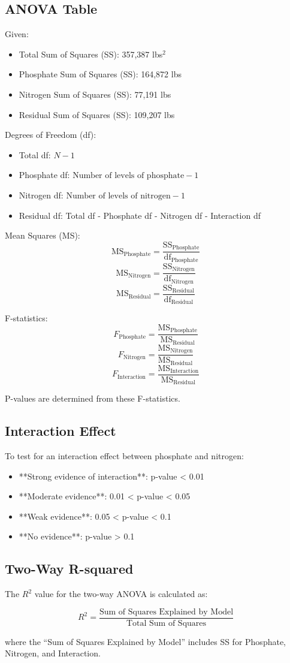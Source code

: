 \documentclass{article}
\begin{document}
\subsection{ANOVA Table}

Given:
\begin{itemize}
    \item Total Sum of Squares (SS): 357,387 lbs\(^2\)
    \item Phosphate Sum of Squares (SS): 164,872 lbs
    \item Nitrogen Sum of Squares (SS): 77,191 lbs
    \item Residual Sum of Squares (SS): 109,207 lbs
\end{itemize}

Degrees of Freedom (df):
\begin{itemize}
    \item Total df: \( N - 1 \)
    \item Phosphate df: \( \text{Number of levels of phosphate} - 1 \)
    \item Nitrogen df: \( \text{Number of levels of nitrogen} - 1 \)
    \item Residual df: Total df - Phosphate df - Nitrogen df - Interaction df
\end{itemize}

Mean Squares (MS):
\[
\text{MS}_{\text{Phosphate}} = \frac{\text{SS}_{\text{Phosphate}}}{\text{df}_{\text{Phosphate}}}
\]
\[
\text{MS}_{\text{Nitrogen}} = \frac{\text{SS}_{\text{Nitrogen}}}{\text{df}_{\text{Nitrogen}}}
\]
\[
\text{MS}_{\text{Residual}} = \frac{\text{SS}_{\text{Residual}}}{\text{df}_{\text{Residual}}}
\]

F-statistics:
\[
F_{\text{Phosphate}} = \frac{\text{MS}_{\text{Phosphate}}}{\text{MS}_{\text{Residual}}}
\]
\[
F_{\text{Nitrogen}} = \frac{\text{MS}_{\text{Nitrogen}}}{\text{MS}_{\text{Residual}}}
\]
\[
F_{\text{Interaction}} = \frac{\text{MS}_{\text{Interaction}}}{\text{MS}_{\text{Residual}}}
\]

P-values are determined from these F-statistics.

\subsection{Interaction Effect}

To test for an interaction effect between phosphate and nitrogen:
\begin{itemize}
    \item **Strong evidence of interaction**: p-value < 0.01
    \item **Moderate evidence**: 0.01 < p-value < 0.05
    \item **Weak evidence**: 0.05 < p-value < 0.1
    \item **No evidence**: p-value > 0.1
\end{itemize}

\subsection{Two-Way R-squared}

The \( R^2 \) value for the two-way ANOVA is calculated as:

\[
R^2 = \frac{\text{Sum of Squares Explained by Model}}{\text{Total Sum of Squares}}
\]

where the “Sum of Squares Explained by Model” includes SS for Phosphate, Nitrogen, and Interaction.
\end{document}
